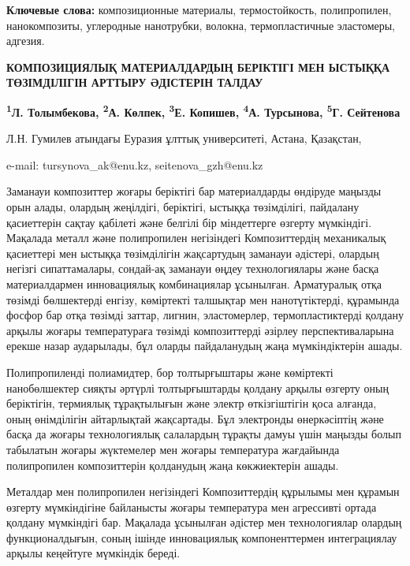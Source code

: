 {\bfseries Ключевые слова:} композиционные материалы, термостойкость,
полипропилен, нанокомпозиты, углеродные нанотрубки, волокна,
термопластичные эластомеры, адгезия.

\begin{articleheader}
{\bfseries КОМПОЗИЦИЯЛЫҚ МАТЕРИАЛДАРДЫҢ БЕРІКТІГІ МЕН ЫСТЫҚҚА ТӨЗІМДІЛІГІН АРТТЫРУ ӘДІСТЕРІН ТАЛДАУ}

{\bfseries
\textsuperscript{1}Л. Толымбекова,
\textsuperscript{2}А. Көлпек,
\textsuperscript{3}Е. Копишев,
\textsuperscript{4}А. Турсынова\textsuperscript{\envelope },
\textsuperscript{5}Г. Сейтенова\textsuperscript{\envelope }
}
\end{articleheader}

\begin{affiliation}
Л.Н. Гумилев атындағы Еуразия ұлттық университеті, Астана, Қазақстан,

e-mail: tursynova\_ak@enu.kz, seitenova\_gzh@enu.kz
\end{affiliation}

Заманауи композиттер жоғары беріктігі бар материалдарды өндіруде маңызды
орын алады, олардың жеңілдігі, беріктігі, ыстыққа төзімділігі, пайдалану
қасиеттерін сақтау қабілеті және белгілі бір міндеттерге өзгерту
мүмкіндігі. Мақалада металл және полипропилен негізіндегі Композиттердің
механикалық қасиеттері мен ыстыққа төзімділігін жақсартудың заманауи
әдістері, олардың негізгі сипаттамалары, сондай-ақ заманауи өңдеу
технологиялары және басқа материалдармен инновациялық комбинациялар
ұсынылған. Арматуралық отқа төзімді бөлшектерді енгізу, көміртекті
талшықтар мен нанотүтіктерді, құрамында фосфор бар отқа төзімді заттар,
лигнин, эластомерлер, термопластиктерді қолдану арқылы жоғары
температураға төзімді композиттерді әзірлеу перспективаларына ерекше
назар аударылады, бұл оларды пайдаланудың жаңа мүмкіндіктерін ашады.

Полипропиленді полиамидтер, бор толтырғыштары және көміртекті
нанобөлшектер сияқты әртүрлі толтырғыштарды қолдану арқылы өзгерту оның
беріктігін, термиялық тұрақтылығын және электр өткізгіштігін қоса
алғанда, оның өнімділігін айтарлықтай жақсартады. Бұл электронды
өнеркәсіптің және басқа да жоғары технологиялық салалардың тұрақты дамуы
үшін маңызды болып табылатын жоғары жүктемелер мен жоғары температура
жағдайында полипропилен композиттерін қолданудың жаңа көкжиектерін
ашады.

Металдар мен полипропилен негізіндегі Композиттердің құрылымы мен
құрамын өзгерту мүмкіндігіне байланысты жоғары температура мен
агрессивті ортада қолдану мүмкіндігі бар. Мақалада ұсынылған әдістер мен
технологиялар олардың функционалдығын, соның ішінде инновациялық
компоненттермен интеграциялау арқылы кеңейтуге мүмкіндік береді.

